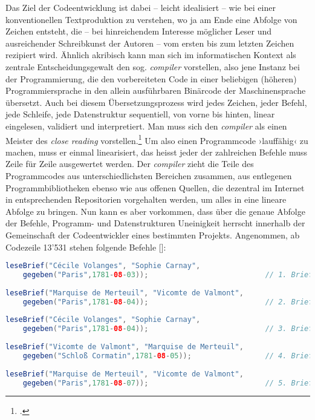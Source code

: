 \documentclass[a4paper,12pt]{article}
\newcommand{\inanf}[1]{›#1‹}
\newcommand{\anzeige}{\textbf{\color{hokkaido}\huge{\raisebox{-0.18ex}{$\bullet$}}\color{black}}}
\begin{document}
Das Ziel der Codeentwicklung ist dabei – leicht idealisiert – wie bei einer konventionellen Textproduktion zu verstehen, wo ja am Ende eine Abfolge von Zeichen entsteht, die – bei hinreichendem Interesse möglicher Leser und ausreichender Schreibkunst der Autoren – vom ersten bis zum letzten Zeichen rezipiert wird. Ähnlich akribisch kann man sich im informatischen Kontext als zentrale Entscheidungsgewalt den sog. \emph{compiler} vorstellen, also jene Instanz bei der Programmierung, die den vorbereiteten Code in einer beliebigen (höheren) Programmiersprache in den allein ausführbaren Binärcode der Maschinensprache übersetzt. Auch bei diesem Übersetzungsprozess wird jedes Zeichen, jeder Befehl, jede Schleife, jede Datenstruktur sequentiell, von vorne bis hinten, linear eingelesen, validiert und interpretiert. Man muss sich den \emph{compiler} als einen Meister des \emph{close reading} vorstellen.\footcite[Hier wäre noch auf die kodifizierende Funktion, das Schliessen des Kodes hinzuweisen, die ja auch vom Compiler vorgenommen wird, vgl.][]{krajewski+vismann:2009} Um also einen Programmcode \inanf{lauffähig} zu machen, muss er einmal linearisiert, das heisst jeder der zahlreichen Befehle muss Zeile für Zeile ausgewertet werden. Der \emph{compiler} zieht die Teile des Programmcodes aus unterschiedlichsten Bereichen zusammen, aus entlegenen Programmbibliotheken ebenso wie aus offenen Quellen, die dezentral im Internet in entsprechenden Repositorien vorgehalten werden, um alles in eine lineare Abfolge zu bringen. Nun kann es aber vorkommen, dass über die genaue Abfolge der Befehle, Programm- und Datenstrukturen Uneinigkeit herrscht innerhalb der Gemeinschaft der Codeentwickler eines bestimmten Projekts. Angenommen, ab Codezeile 13'531 stehen folgende Befehle [\anzeige]:

\begin{lstlisting}[language=Java, firstnumber=13531]
leseBrief("Cécile Volanges", "Sophie Carnay", 
	gegeben("Paris",1781-08-03));                           // 1. Brief
	
leseBrief("Marquise de Merteuil", "Vicomte de Valmont", 
	gegeben("Paris",1781-08-04));                           // 2. Brief
	
leseBrief("Cécile Volanges", "Sophie Carnay", 
	gegeben("Paris",1781-08-04));                           // 3. Brief
	
leseBrief("Vicomte de Valmont", "Marquise de Merteuil", 
	gegeben("Schloß Cormatin",1781-08-05));                 // 4. Brief
	
leseBrief("Marquise de Merteuil", "Vicomte de Valmont", 
	gegeben("Paris",1781-08-07));                           // 5. Brief

\end{lstlisting}
\end{document}
